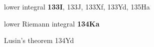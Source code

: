 



































































lower integral {\bf 133I}, 133J, 133Xf, 133Yd, 135Ha





lower Riemann integral {\bf 134Ka}












Lusin's theorem 134Yd





